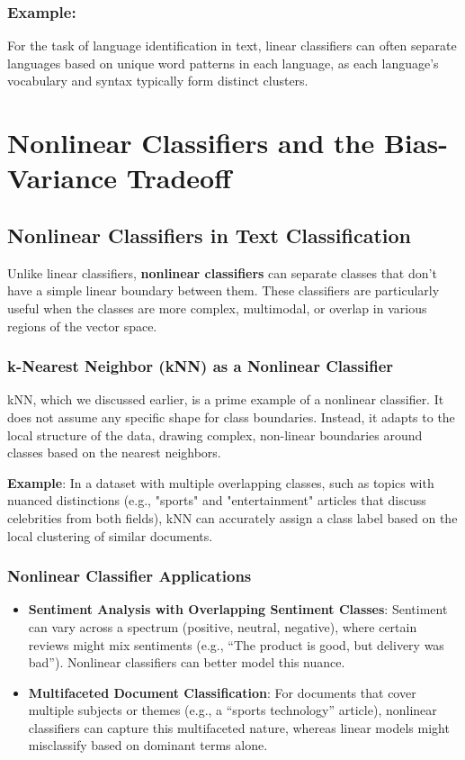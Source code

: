 \documentclass{article}
\begin{document}
\subsubsection*{Example:}
For the task of language identification in text, linear classifiers can often separate languages based on unique word patterns in each language, as each language’s vocabulary and syntax typically form distinct clusters.
\section{Nonlinear Classifiers and the Bias-Variance Tradeoff}

\subsection{Nonlinear Classifiers in Text Classification}

Unlike linear classifiers, \textbf{nonlinear classifiers} can separate classes that don’t have a simple linear boundary between them. These classifiers are particularly useful when the classes are more complex, multimodal, or overlap in various regions of the vector space.

\subsubsection*{k-Nearest Neighbor (kNN) as a Nonlinear Classifier}

kNN, which we discussed earlier, is a prime example of a nonlinear classifier. It does not assume any specific shape for class boundaries. Instead, it adapts to the local structure of the data, drawing complex, non-linear boundaries around classes based on the nearest neighbors.

\textbf{Example}: In a dataset with multiple overlapping classes, such as topics with nuanced distinctions (e.g., "sports" and "entertainment" articles that discuss celebrities from both fields), kNN can accurately assign a class label based on the local clustering of similar documents.

\subsubsection*{Nonlinear Classifier Applications}
\begin{itemize}
    \item \textbf{Sentiment Analysis with Overlapping Sentiment Classes}: Sentiment can vary across a spectrum (positive, neutral, negative), where certain reviews might mix sentiments (e.g., “The product is good, but delivery was bad”). Nonlinear classifiers can better model this nuance.
    \item \textbf{Multifaceted Document Classification}: For documents that cover multiple subjects or themes (e.g., a “sports technology” article), nonlinear classifiers can capture this multifaceted nature, whereas linear models might misclassify based on dominant terms alone.
\end{itemize}
\end{document}
